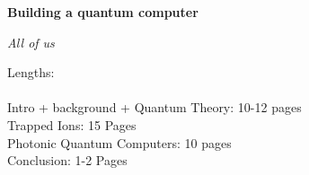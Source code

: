 \documentclass[a4paper]{article}
\begin{document}
\begin{center}
    \Huge \textbf{Building a quantum computer}
\end{center}
\vspace{-1em}

\begin{center}
    \emph{\large All of us}
\end{center}
\vspace{0.5em}
Lengths:\\ \\
Intro + background + Quantum Theory: 10-12 pages\\
Trapped Ions: 15 Pages\\
Photonic Quantum Computers: 10 pages\\
Conclusion: 1-2 Pages\\












\printbibliography
\end{document}
